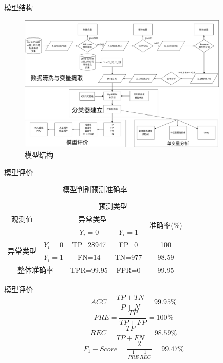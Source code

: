 \begin{frame}[fragile]{模型结构}
    \begin{figure}
        \includegraphics[width=10cm]{Pic/模型结构.pdf}
        \caption{模型结构}
    \end{figure}
\end{frame}

\begin{frame}[fragile]{模型评价}
    \begin{table}[]
        \caption{模型判别预测准确率}
        \begin{tabular}{ccccc}
        \toprule
        \multirow{3}{*}{观测值}  & \multicolumn{4}{c}{预测类型}                                     \\ \cline{2-5}
                                & \multicolumn{3}{c}{异常类型}          & \multirow{2}{*}{准确率(\%)} \\ \cline{2-4}
                                &           & $Y_{i}=0$ & $Y_{i}=1$ &                          \\ \hline
        \multirow{2}{*}{异常类型} & $Y_{i}=0$ & TP=28947  & FP=0      & 100                      \\
                                & $Y_{i}=1$ & FN=14     & TN=977    & 98.59                    \\ \cline{1-2}
        \multicolumn{2}{c}{整体准确率}         & TPR=99.95 & FPR=0     & 99.95                    \\ \bottomrule
        \end{tabular}
        \end{table}
\end{frame}

\begin{frame}[fragile]{模型评价}
    $$ACC=\frac{TP+TN}{P+N}=99.95\%$$
    $$PRE=\frac{TP}{TP+FP}=100\%$$
    $$REC=\frac{TP}{TP+FN}=98.59\%$$
    $$F_{1}-Score=\frac{2}{\frac{1}{PRE}\frac{1}{REC}}=99.47\%$$
\end{frame}

